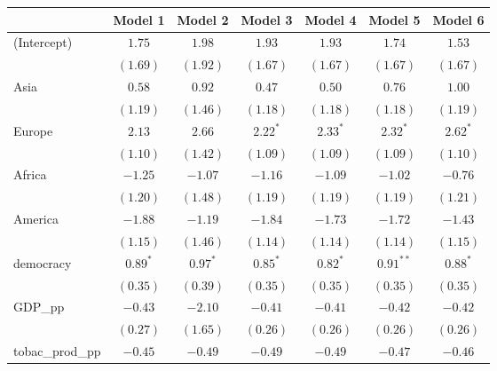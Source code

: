 
\begin{table}[!h]
\begin{center}
\begin{tabular}{l c c c c c c }
\toprule
 & Model 1 & Model 2 & Model 3 & Model 4 & Model 5 & Model 6 \\
\midrule
(Intercept)             & $1.75$       & $1.98$       & $1.93$       & $1.93$       & $1.74$       & $1.53$       \\
                        & $(1.69)$     & $(1.92)$     & $(1.67)$     & $(1.67)$     & $(1.67)$     & $(1.67)$     \\
Asia                    & $0.58$       & $0.92$       & $0.47$       & $0.50$       & $0.76$       & $1.00$       \\
                        & $(1.19)$     & $(1.46)$     & $(1.18)$     & $(1.18)$     & $(1.18)$     & $(1.19)$     \\
Europe                  & $2.13$       & $2.66$       & $2.22^{*}$   & $2.33^{*}$   & $2.32^{*}$   & $2.62^{*}$   \\
                        & $(1.10)$     & $(1.42)$     & $(1.09)$     & $(1.09)$     & $(1.09)$     & $(1.10)$     \\
Africa                  & $-1.25$      & $-1.07$      & $-1.16$      & $-1.09$      & $-1.02$      & $-0.76$      \\
                        & $(1.20)$     & $(1.48)$     & $(1.19)$     & $(1.19)$     & $(1.19)$     & $(1.21)$     \\
America                 & $-1.88$      & $-1.19$      & $-1.84$      & $-1.73$      & $-1.72$      & $-1.43$      \\
                        & $(1.15)$     & $(1.46)$     & $(1.14)$     & $(1.14)$     & $(1.14)$     & $(1.15)$     \\
democracy               & $0.89^{*}$   & $0.97^{*}$   & $0.85^{*}$   & $0.82^{*}$   & $0.91^{**}$  & $0.88^{*}$   \\
                        & $(0.35)$     & $(0.39)$     & $(0.35)$     & $(0.35)$     & $(0.35)$     & $(0.35)$     \\
GDP\_pp                 & $-0.43$      & $-2.10$      & $-0.41$      & $-0.41$      & $-0.42$      & $-0.42$      \\
                        & $(0.27)$     & $(1.65)$     & $(0.26)$     & $(0.26)$     & $(0.26)$     & $(0.26)$     \\
tobac\_prod\_pp         & $-0.45$      & $-0.49$      & $-0.49$      & $-0.49$      & $-0.47$      & $-0.46$      \\

\end{tabular}
\end{center}
\end{table}
